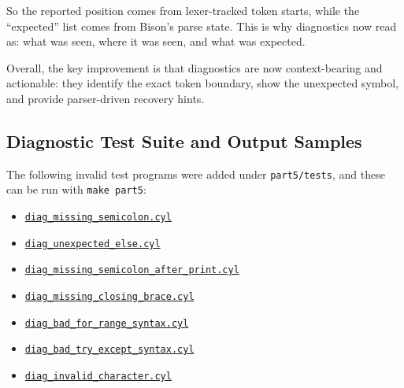 \documentclass[a4paper,12pt]{article}
\begin{document}
\vspace{0.5cm}
So the reported position comes from lexer-tracked token starts, while the ``expected'' list comes from Bison's parse state. This is why diagnostics now read as: what was seen, where it was seen, and what was expected.

Overall, the key improvement is that diagnostics are now context-bearing and actionable: they identify the exact token boundary, show the unexpected symbol, and provide parser-driven recovery hints.



\subsection{Diagnostic Test Suite and Output Samples}

The following invalid test programs were added under \texttt{part5/tests}, and these can be run with \texttt{make part5}:
\begin{itemize}
    \item \href{https://github.com/ShardulJunagade/compilers-cylite/blob/main/cylite_A3/part5/tests/diag_missing_semicolon.cyl}{\texttt{diag\_missing\_semicolon.cyl}}
    \item \href{https://github.com/ShardulJunagade/compilers-cylite/blob/main/cylite_A3/part5/tests/diag_unexpected_else.cyl}{\texttt{diag\_unexpected\_else.cyl}}
    \item \href{https://github.com/ShardulJunagade/compilers-cylite/blob/main/cylite_A3/part5/tests/diag_missing_semicolon_after_print.cyl}{\texttt{diag\_missing\_semicolon\_after\_print.cyl}}
    \item \href{https://github.com/ShardulJunagade/compilers-cylite/blob/main/cylite_A3/part5/tests/diag_missing_closing_brace.cyl}{\texttt{diag\_missing\_closing\_brace.cyl}}
    \item \href{https://github.com/ShardulJunagade/compilers-cylite/blob/main/cylite_A3/part5/tests/diag_bad_for_range_syntax.cyl}{\texttt{diag\_bad\_for\_range\_syntax.cyl}}
    \item \href{https://github.com/ShardulJunagade/compilers-cylite/blob/main/cylite_A3/part5/tests/diag_bad_try_except_syntax.cyl}{\texttt{diag\_bad\_try\_except\_syntax.cyl}}
    \item \href{https://github.com/ShardulJunagade/compilers-cylite/blob/main/cylite_A3/part5/tests/diag_invalid_character.cyl}{\texttt{diag\_invalid\_character.cyl}}
\end{itemize}
\end{document}
